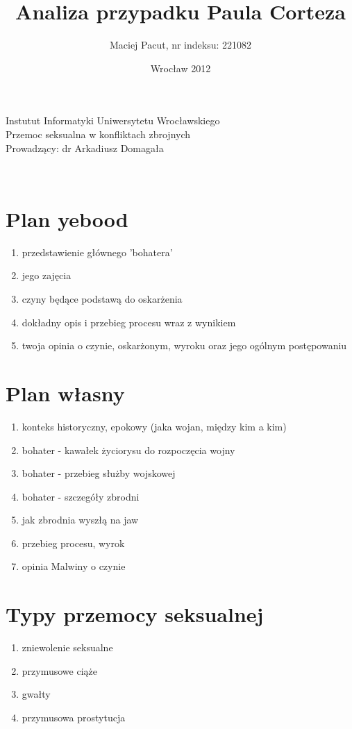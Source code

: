 \documentclass[12pt,a4paper]{article}
\title{Analiza przypadku Paula Corteza}
\author{Maciej Pacut, nr indeksu: 221082}
\date{Wrocław 2012}
\makeatletter
\renewcommand{\maketitle}{\begin{titlepage}
    \vspace*{1cm}
    \begin{center}
      Instutut Informatyki Uniwersytetu Wrocławskiego\\
      Przemoc seksualna w konfliktach zbrojnych \\
      Prowadzący: dr Arkadiusz Domagała \\
      \vspace{3cm}
      \normalsize \@author \par
      \vspace{0.8cm}
      \noindent
      \LARGE \textsc{\@title}\\
      \vspace{1cm}
      \normalsize
    \end{center}
    \vspace{0.5cm}
    \begin{flushright}
      \vspace{5cm}
    \end{flushright}
    \vspace*{\stretch{6}}
    \begin{center}
      \@date
    \end{center}
  \end{titlepage}%
}
\makeatother
\begin{document}
\maketitle
\newpage

\section{Plan yebood}

\begin{enumerate}
 \item przedstawienie głównego 'bohatera' 
 \item jego zajęcia 
 \item czyny będące podstawą do oskarżenia 
 \item dokładny opis i przebieg procesu wraz z wynikiem 
 \item twoja opinia o czynie, oskarżonym, wyroku oraz jego ogólnym postępowaniu
\end{enumerate}

\section{Plan własny}

\begin{enumerate}
 \item konteks historyczny, epokowy (jaka wojan, między kim a kim)
 \item bohater - kawałek życiorysu do rozpoczęcia wojny
 \item bohater - przebieg służby wojskowej
 \item bohater - szczegóły zbrodni
 \item jak zbrodnia wyszłą na jaw
 \item przebieg procesu, wyrok
 \item opinia Malwiny o czynie
\end{enumerate}

\section{Typy przemocy seksualnej}


\begin{enumerate}
 \item zniewolenie seksualne
 \item przymusowe ciąże
 \item gwałty
 \item przymusowa prostytucja
\end{enumerate}
\end{document}
